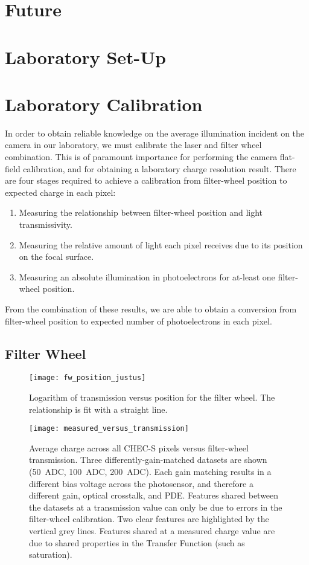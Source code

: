 \section{Future}

\section{Laboratory Set-Up}

\section{Laboratory Calibration} \label{section:lab-calib}

In order to obtain reliable knowledge on the average illumination incident on the camera in our laboratory, we must calibrate the laser and filter wheel combination. This is of paramount importance for performing the camera flat-field calibration, and for obtaining a laboratory charge resolution result. There are four stages required to achieve a calibration from filter-wheel position to expected charge in each pixel:
\begin{enumerate}
\item Measuring the relationship between filter-wheel position and light transmissivity.
\item Measuring the relative amount of light each pixel receives due to its position on the focal surface.
\item Measuring an absolute illumination in photoelectrons for at-least one filter-wheel position.
\end{enumerate}
From the combination of these results, we are able to obtain a conversion from filter-wheel position to expected number of photoelectrons in each pixel.

\subsection{Filter Wheel}

\begin{figure}
	\centering
    \texttt{[image: fw\_position\_justus]} 
	\caption[Filter-wheel Position Calibration]{Logarithm of transmission versus position for the filter wheel. The relationship is fit with a straight line.}
	\label{fig:fw_position}
\end{figure}

\begin{figure}
	\centering
    \texttt{[image: measured\_versus\_transmission]} 
	\caption[Measured charge versus transmission]{Average charge across all CHEC-S pixels versus filter-wheel transmission. Three differently-gain-matched datasets are shown (50~ADC, 100~ADC, 200~ADC). Each gain matching results in a different bias voltage across the photosensor, and therefore a different gain, optical crosstalk, and PDE. Features shared between the datasets at a transmission value can only be due to errors in the filter-wheel calibration. Two clear features are highlighted by the vertical grey lines. Features shared at a measured charge value are due to shared properties in the Transfer Function (such as saturation).}
	\label{fig:measured_versus_transmission}
\end{figure}

